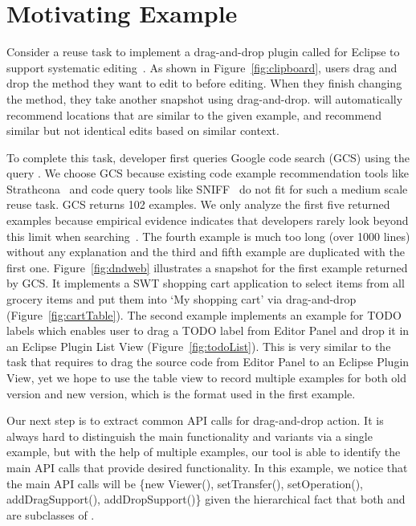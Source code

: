 \section{Motivating Example}

Consider a reuse task to implement a drag-and-drop plugin called \tool for Eclipse to support systematic editing~\cite{Meng:sydit11}. As shown in Figure~\ref{fig:clipboard}, users drag and drop the method they want to edit to \tool before editing. When they finish changing the method, they take another snapshot using drag-and-drop. \tool will automatically recommend locations that  are similar to the given example, and recommend similar but not identical edits based on similar context. 

To complete this task, developer first queries Google code search (GCS) using the query . We choose GCS because existing code example recommendation tools like Strathcona~\cite{Holmes:structural05} and code query tools like SNIFF~\cite{sniff:Sen09}  do not fit for such a medium scale reuse task. GCS returns 102 examples. We only analyze the first five returned examples because empirical evidence indicates that developers rarely look beyond this limit when searching~\cite{Starke:searchNum09}. The fourth example is much too long (over 1000 lines) without any explanation and the third and fifth example are duplicated with the first one. Figure~\ref{fig:dndweb} illustrates a snapshot for the first example returned by GCS. It implements a SWT shopping cart application to select items from all grocery items and put them into `My shopping cart' via drag-and-drop (Figure~\ref{fig:cartTable}). The second example implements an example for TODO labels which enables user to drag a TODO label from Editor Panel and drop it in an Eclipse Plugin List View (Figure~\ref{fig:todoList}). This is very similar to the task that requires to drag the source code from Editor Panel to an Eclipse Plugin View, yet we hope to use the table view to record multiple examples for both old version and new version, which is the format used in the first example. 

Our next step is to extract common API calls for drag-and-drop action. It is always hard to distinguish the main functionality and variants via a single example, but with the help of multiple examples, our tool is able to identify the main API calls that provide desired functionality. In this example, we notice that the main API calls will be \{new Viewer(), setTransfer(), setOperation(), addDragSupport(), addDropSupport()\} given the hierarchical fact that both  and  are subclasses of . 

